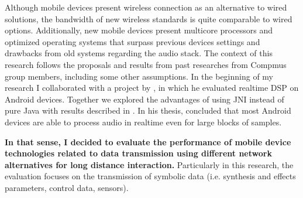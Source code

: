 Although mobile devices present wireless connection as an alternative to wired solutions, the bandwidth of new wireless standards is quite comparable to wired options.
Additionally, new mobile devices present multicore processors and optimized operating systems that surpass previous devices settings and drawbacks from old systems regarding the audio stack.
The context of this research follows the proposals and results from past researches from Compmus group members, including some other assumptions.
In the beginning of my research I collaborated with a project by , in which he evaluated realtime DSP on Android devices.
Together we explored the advantages of using JNI instead of pure Java with results described in \citep{deCarvalhoJunior2013fftbenchmark}.
In his thesis,  concluded that most Android devices are able to process audio in realtime even for large blocks of samples.



\textbf{In that sense, I decided to evaluate the performance of mobile device technologies related to data transmission using different network alternatives for long distance interaction.}
Particularly in this research, the evaluation focuses on the transmission of symbolic data (i.e. synthesis and effects parameters, control data, sensors).


